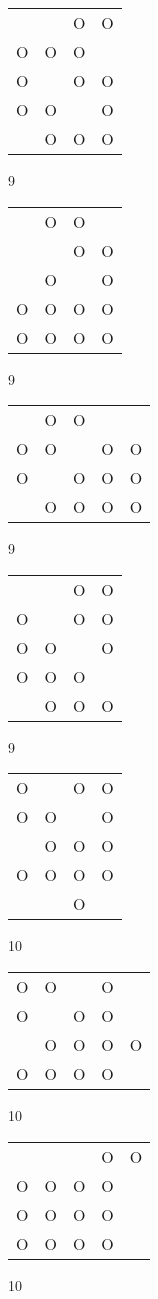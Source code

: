\begin{tabular}{|m{0.2cm}m{0.2cm}m{0.2cm}m{0.2cm}|}\hline
 & &O&O\\
O&O&O& \\
O& &O&O\\
O&O& &O\\
 &O&O&O\\
\hline\end{tabular}9
\begin{tabular}{|m{0.2cm}m{0.2cm}m{0.2cm}m{0.2cm}|}\hline
 &O&O& \\
 & &O&O\\
 &O& &O\\
O&O&O&O\\
O&O&O&O\\
\hline\end{tabular}9
\begin{tabular}{|m{0.2cm}m{0.2cm}m{0.2cm}m{0.2cm}m{0.2cm}|}\hline
 &O&O& & \\
O&O& &O&O\\
O& &O&O&O\\
 &O&O&O&O\\
\hline\end{tabular}9
\begin{tabular}{|m{0.2cm}m{0.2cm}m{0.2cm}m{0.2cm}|}\hline
 & &O&O\\
O& &O&O\\
O&O& &O\\
O&O&O& \\
 &O&O&O\\
\hline\end{tabular}9
\begin{tabular}{|m{0.2cm}m{0.2cm}m{0.2cm}m{0.2cm}|}\hline
O& &O&O\\
O&O& &O\\
 &O&O&O\\
O&O&O&O\\
 & &O& \\
\hline\end{tabular}10
\begin{tabular}{|m{0.2cm}m{0.2cm}m{0.2cm}m{0.2cm}m{0.2cm}|}\hline
O&O& &O& \\
O& &O&O& \\
 &O&O&O&O\\
O&O&O&O& \\
\hline\end{tabular}10
\begin{tabular}{|m{0.2cm}m{0.2cm}m{0.2cm}m{0.2cm}m{0.2cm}|}\hline
 & & &O&O\\
O&O&O&O& \\
O&O&O&O& \\
O&O&O&O& \\
\hline\end{tabular}10
